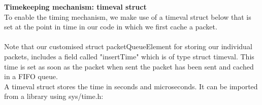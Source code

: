 \documentclass{uathesis}
\begin{document}
\noindent \textbf{Timekeeping mechanism: timeval struct }\\
To enable the timing mechanism, we make use of a timeval struct below that is set at the point in time in our code in which we first cache a packet.  \\

 \\

Note that our customised struct packetQueueElement for storing our individual packets, includes a field called "insertTime" which is of type struct timeval. This time is set as soon as the packet when sent the packet has been sent and cached in a FIFO queue.\\

A timeval struct stores the time in seconds and microseconds. It can be imported from a library using sys/time.h: \\

 \\
\end{document}
